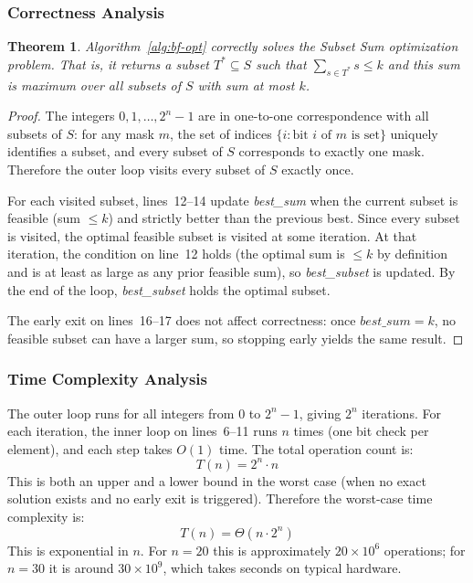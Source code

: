 \documentclass[12pt,a4paper]{article}
\newtheorem{theorem}{Theorem}[section]
\theoremstyle{definition}
\begin{document}
\subsubsection{Correctness Analysis}

\begin{theorem}
  Algorithm~\ref{alg:bf-opt} correctly solves the Subset Sum optimization
  problem. That is, it returns a subset $T^* \subseteq S$ such that
  $\sum_{s \in T^*} s \leq k$ and this sum is maximum over all subsets of $S$
  with sum at most $k$.
\end{theorem}

\begin{proof}
The integers $0, 1, \ldots, 2^n - 1$ are in one-to-one correspondence with all
subsets of $S$: for any mask $m$, the set of indices $\{i : \text{bit } i
\text{ of } m \text{ is set}\}$ uniquely identifies a subset, and every subset
of $S$ corresponds to exactly one mask. Therefore the outer loop visits every
subset of $S$ exactly once.

For each visited subset, lines~12--14 update \textit{best\_sum} when the current
subset is feasible (sum $\leq k$) and strictly better than the previous best.
Since every subset is visited, the optimal feasible subset is visited at some
iteration. At that iteration, the condition on line~12 holds (the optimal sum
is $\leq k$ by definition and is at least as large as any prior feasible sum),
so \textit{best\_subset} is updated. By the end of the loop,
\textit{best\_subset} holds the optimal subset.

The early exit on lines~16--17 does not affect correctness: once
$\textit{best\_sum} = k$, no feasible subset can have a larger sum, so stopping
early yields the same result.
\end{proof}

\subsubsection{Time Complexity Analysis}

The outer loop runs for all integers from $0$ to $2^n - 1$, giving $2^n$
iterations. For each iteration, the inner loop on lines~6--11 runs $n$ times
(one bit check per element), and each step takes $O(1)$ time. The total
operation count is:
\[
  T(n) = 2^n \cdot n
\]
This is both an upper and a lower bound in the worst case (when no exact
solution exists and no early exit is triggered). Therefore the worst-case
time complexity is:
\[
  \boxed{T(n) = \Theta(n \cdot 2^n)}
\]
This is exponential in $n$. For $n = 20$ this is approximately $20 \times 10^6$
operations; for $n = 30$ it is around $30 \times 10^9$, which takes seconds
on typical hardware.
\end{document}
